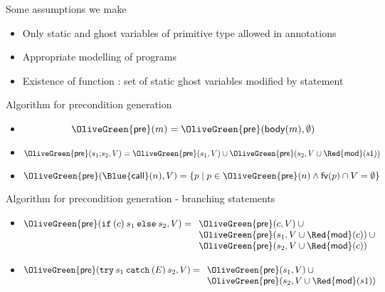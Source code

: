 \documentclass[final,nocolorBG,a4,marieke,nototal,pdf, accumulate,slideColor]{prosper}
\begin{document}
\begin{slide}{Some assumptions we make}
\begin{itemize}
  \item Only static and ghost variables of primitive type allowed in
annotations  
  \item Appropriate modelling of programs
  \item Existence of function {\large\textsf{}}: set of static ghost
variables modified by statement 
\end{itemize}
\end{slide}

\begin{slide}{Algorithm for precondition generation}
\begin{itemize}
   \item {}
\[\mathsf{\OliveGreen{pre}}(m)  =  \mathsf{\OliveGreen{pre}}(\mathsf{body}(m), \emptyset)\]
   \item {}
\[\mathsf{\OliveGreen{pre}}(s_1 \mathtt{;} s_2, V)  =  \mathsf{\OliveGreen{pre}}(s_1, V) \cup 
                                          \mathsf{\OliveGreen{pre}}(s_2, V \cup
\mathsf{\Red{mod}}(s1))\]
   \item {}
\[\mathsf{\OliveGreen{pre}}(\mathsf{\Blue{call}}(n),V)  =  
                \{ p \mid p \in \mathsf{\OliveGreen{pre}}(n) \wedge 
                          \mathsf{fv}(p) \cap V = \emptyset\}\]
\end{itemize}
\end{slide}

\begin{slide}{Algorithm for precondition generation - branching statements}
\begin{itemize}
   \item {}
\[
\mathsf{\OliveGreen{pre}}(\mathtt{if\:(} c \mathtt{)\:} s_1 \mathtt{\:else\:} s_2,
V)  = 
\begin{array}[t]{l}
   \mathsf{\OliveGreen{pre}}(c, V) \:\cup \\
   \mathsf{\OliveGreen{pre}}(s_1, V \cup \mathsf{\Red{mod}}(c)) \:\cup\\
   \mathsf{\OliveGreen{pre}}(s_2, V \cup \mathsf{\Red{mod}}(c))
\end{array}\]
\item {}
\[\mathsf{\OliveGreen{pre}}(\mathtt{try\:} s_1 \mathtt{\:catch\:(} E \mathtt{)\:} s_2, V)  =  \begin{array}[t]{l}
   \mathsf{\OliveGreen{pre}}(s_1, V) \:\cup \\
   \mathsf{\OliveGreen{pre}}(s_2, V \cup \mathsf{\Red{mod}}(s1))
  \end{array}\]
\end{itemize}
\end{slide}
\end{document}
